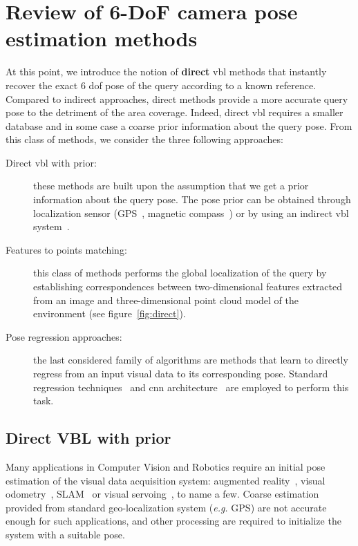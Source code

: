\section{Review of 6-DoF camera pose estimation methods}
\label{sec:fine_pose_estimation}

	At this point, we introduce the notion of \textbf{direct} \ac{vbl} methods that instantly recover the exact 6 \ac{dof} pose of the query according to a known reference. Compared to indirect approaches, direct methods provide a more accurate query pose to the detriment of the area coverage. Indeed, direct \ac{vbl} requires a smaller database and in some case a coarse prior information about the query pose. From this class of methods, we consider the three following approaches:
	\begin{description}
		\item[Direct \ac{vbl} with prior:] these methods are built upon the assumption that we get a prior information about the query pose. The pose prior can be obtained through localization sensor (GPS~\citep{Chen2011,Arth2015,Poglitsch2015}, magnetic compass~\citep{Svarm2014,Zeisl2015,Svarm2016}) or by using an indirect \ac{vbl} system~\citep{Torii2011,Song2016,Sattler2017}.
		\item[Features to points matching:] this class of methods performs the global localization of the query by establishing correspondences between two-dimensional features extracted from an image and three-dimensional point cloud model of the environment (see figure~\ref{fig:direct}).
		\item[Pose regression approaches:] the last considered family of algorithms are methods that learn to directly regress from an input visual data to its corresponding pose. Standard regression techniques~\citep{Shotton2013} and \ac{cnn} architecture~\citep{Kendall2015} are employed to perform this task.
	\end{description}

	\subsection{Direct VBL with prior}
   		\label{vbl_prior}
		Many applications in Computer Vision and Robotics require an initial  pose estimation of the visual data acquisition system: augmented reality~\citep{Arth2015}, visual odometry~\citep{Pascoe2015a}, SLAM~\citep{Milford2012} or visual servoing~\citep{Marchand2016}, to name a few. Coarse estimation provided from standard geo-localization system (\textit{e.g.} GPS) are not accurate enough for such applications, and other processing are required to initialize the system with a suitable pose.
		
